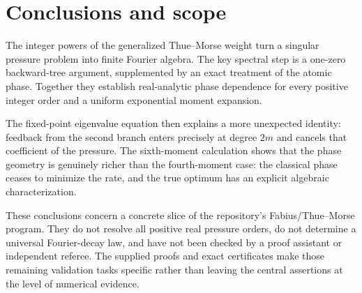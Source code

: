 \documentclass[11pt,a4paper]{article}
\numberwithin{equation}{section}
\theoremstyle{definition}
\theoremstyle{remark}
\begin{document}
\section{Conclusions and scope}
The integer powers of the generalized Thue--Morse weight turn a singular
pressure problem into finite Fourier algebra. The key spectral step is
a one-zero backward-tree argument, supplemented by an exact treatment
of the atomic phase. Together they establish real-analytic phase
dependence for every positive integer order and a uniform exponential
moment expansion.

The fixed-point eigenvalue equation then explains a more unexpected
identity: feedback from the second branch enters precisely at degree
$2m$ and cancels that coefficient of the pressure. The sixth-moment
calculation shows that the phase geometry is genuinely richer than the
fourth-moment case: the classical phase ceases to minimize the rate,
and the true optimum has an explicit algebraic characterization.

These conclusions concern a concrete slice of the repository's
Fabius/Thue--Morse program. They do not resolve all positive real pressure
orders, do not determine a universal Fourier-decay law, and have not
been checked by a proof assistant or independent referee. The supplied
proofs and exact certificates make those remaining validation tasks
specific rather than leaving the central assertions at the level of
numerical evidence.

\appendix
\end{document}
